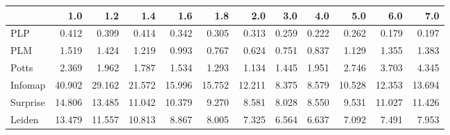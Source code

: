 \begin{tabular}{lrrrrrrrrrrr}
\toprule
{} &    1.0 &    1.2 &    1.4 &    1.6 &    1.8 &    2.0 &   3.0 &   4.0 &    5.0 &    6.0 &    7.0 \\
\midrule
PLP      &  0.412 &  0.399 &  0.414 &  0.342 &  0.305 &  0.313 & 0.259 & 0.222 &  0.262 &  0.179 &  0.197 \\
PLM      &  1.519 &  1.424 &  1.219 &  0.993 &  0.767 &  0.624 & 0.751 & 0.837 &  1.129 &  1.355 &  1.383 \\
Potts    &  2.369 &  1.962 &  1.787 &  1.534 &  1.293 &  1.134 & 1.445 & 1.951 &  2.746 &  3.703 &  4.345 \\
Infomap  & 40.902 & 29.162 & 21.572 & 15.996 & 15.752 & 12.211 & 8.375 & 8.579 & 10.528 & 12.353 & 13.694 \\
Surprise & 14.806 & 13.485 & 11.042 & 10.379 &  9.270 &  8.581 & 8.028 & 8.550 &  9.531 & 11.027 & 11.426 \\
Leiden   & 13.479 & 11.557 & 10.813 &  8.867 &  8.005 &  7.325 & 6.564 & 6.637 &  7.092 &  7.491 &  7.953 \\
\bottomrule
\end{tabular}
